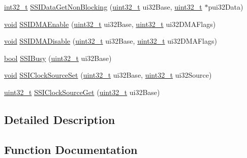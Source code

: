 \begin{DoxyCompactItemize}
\item 
\hyperlink{_p_e___types_8h_adb828ef50c2dbb783109824e94cf6c47}{int32\+\_\+t} \hyperlink{group__ssi__api_gadbf2638243a50eb412a9089d8d04184e}{S\+S\+I\+Data\+Get\+Non\+Blocking} (\hyperlink{_p_e___types_8h_a33594304e786b158f3fb30289278f5af}{uint32\+\_\+t} ui32\+Base, \hyperlink{_p_e___types_8h_a33594304e786b158f3fb30289278f5af}{uint32\+\_\+t} $\ast$pui32\+Data)
\item 
\hyperlink{usb__devapi_8h_afabf60e7f57651d6d595a02c75f07cd0}{void} \hyperlink{group__ssi__api_ga897bf9d2d751cb23cdef74c222ed141e}{S\+S\+I\+D\+M\+A\+Enable} (\hyperlink{_p_e___types_8h_a33594304e786b158f3fb30289278f5af}{uint32\+\_\+t} ui32\+Base, \hyperlink{_p_e___types_8h_a33594304e786b158f3fb30289278f5af}{uint32\+\_\+t} ui32\+D\+M\+A\+Flags)
\item 
\hyperlink{usb__devapi_8h_afabf60e7f57651d6d595a02c75f07cd0}{void} \hyperlink{group__ssi__api_ga470e04b0fea55d1bd111712976017d9d}{S\+S\+I\+D\+M\+A\+Disable} (\hyperlink{_p_e___types_8h_a33594304e786b158f3fb30289278f5af}{uint32\+\_\+t} ui32\+Base, \hyperlink{_p_e___types_8h_a33594304e786b158f3fb30289278f5af}{uint32\+\_\+t} ui32\+D\+M\+A\+Flags)
\item 
\hyperlink{_p_e___types_8h_a97a80ca1602ebf2303258971a2c938e2}{bool} \hyperlink{group__ssi__api_ga29159753a8c5831a4460663c22f9e52c}{S\+S\+I\+Busy} (\hyperlink{_p_e___types_8h_a33594304e786b158f3fb30289278f5af}{uint32\+\_\+t} ui32\+Base)
\item 
\hyperlink{usb__devapi_8h_afabf60e7f57651d6d595a02c75f07cd0}{void} \hyperlink{group__ssi__api_gaaaaf45725698f4c264582a58c9a359bb}{S\+S\+I\+Clock\+Source\+Set} (\hyperlink{_p_e___types_8h_a33594304e786b158f3fb30289278f5af}{uint32\+\_\+t} ui32\+Base, \hyperlink{_p_e___types_8h_a33594304e786b158f3fb30289278f5af}{uint32\+\_\+t} ui32\+Source)
\item 
\hyperlink{_p_e___types_8h_a33594304e786b158f3fb30289278f5af}{uint32\+\_\+t} \hyperlink{group__ssi__api_ga1254e7ea5b8cc1b52b41d29389aba3c2}{S\+S\+I\+Clock\+Source\+Get} (\hyperlink{_p_e___types_8h_a33594304e786b158f3fb30289278f5af}{uint32\+\_\+t} ui32\+Base)
\end{DoxyCompactItemize}


\subsection{Detailed Description}


\subsection{Function Documentation}

